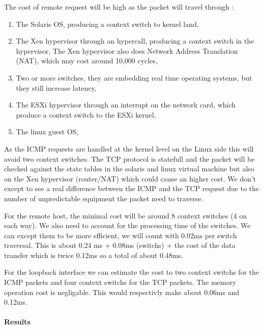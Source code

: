 The cost of remote request will be high as the packet will travel through :
\begin{enumerate}
\item The Solaris OS, producing a context switch to kernel land,
\item The Xen hypervisor through an hypercall, producing a context switch in the
hypervisor,
The Xen hypervisor also does Network Address Translation (NAT), which may cost
around 10,000 cycles,
\item Two or more switches, they are embedding real time operating systems,
but they still increase latency,
\item The ESXi hypervisor through an interrupt on the network card, which
produce a context switch to the ESXi kernel,
\item The linux guest OS,
\end{enumerate}

As the ICMP requests are handled at the kernel level on the Linux side this will
avoid two context switches.
The TCP protocol is statefull and the packet will be checked against the state
tables in the solaris and linux virtual machine but also on the Xen hypervisor
(router/NAT) which could cause an higher cost.
We don't except to see a real difference between the ICMP and the TCP request
due to the number of unpredictable equipment the packet need to traverse.

For the remote host, the minimal cost will be around 8 context switches (4 on
each way).
We also need to account for the processing time of the switches.
We can except them to be more efficient, we will count with 0.02ms per switch traversal.
This is about 0.24 ms + 0.08ms (switchs) + the cost of the data transfer which is twice 0.12ms so a total of
about 0.48ms.

For the loopback interface we can estimate the cost to two context switchs for
the ICMP packets and four context switchs for the TCP packets.
The memory operation cost is negligable.
This would respectivly make about 0.06ms and 0.12ms.




\paragraph{Results}


